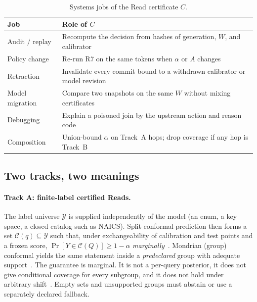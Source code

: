 \documentclass[sigconf, nonacm]{acmart}
\begin{document}
\begin{table}[t]
\caption{Systems jobs of the Read certificate $C$.}
\label{tab:certuses}
\small
\begin{tabular}{@{}>{\raggedright\arraybackslash}p{}
                >{\raggedright\arraybackslash}p{}@{}}
\toprule
Job & Role of $C$ \\
\midrule
Audit / replay & Recompute the decision from hashes of generation, $W$, and calibrator \\
Policy change & Re-run R7 on the same tokens when $\alpha$ or $A$ changes \\
Retraction & Invalidate every commit bound to a withdrawn calibrator or model revision \\
Model migration & Compare two snapshots on the same $W$ without mixing certificates \\
Debugging & Explain a poisoned join by the upstream action and reason code \\
Composition & Union-bound $\alpha$ on Track~A hops; drop coverage if any hop is Track~B \\
\bottomrule
\end{tabular}
\end{table}

\subsection{Two tracks, two meanings}
\label{sec:tracks}

\paragraph{Track A: finite-label certified Reads.}
The label universe $\mathcal{Y}$ is supplied independently of the model (an enum, a key space, a closed catalog such as NAICS). Split conformal prediction then forms a set $\mathcal{C}(q)\subseteq\mathcal{Y}$ such that, under exchangeability of calibration and test points and a frozen score, $\Pr[Y \in \mathcal{C}(Q)] \ge 1-\alpha$ \emph{marginally}~\cite{vovk2005algorithmic,quach2024conformal}. Mondrian (group) conformal yields the same statement inside a \emph{predeclared} group with adequate support~\cite{gibbs2024conformal}. The guarantee is marginal. It is not a per-query posterior, it does not give conditional coverage for every subgroup, and it does not hold under arbitrary shift~\cite{tibshirani2019weighted}. Empty sets and unsupported groups must abstain or use a separately declared fallback.
\end{document}
